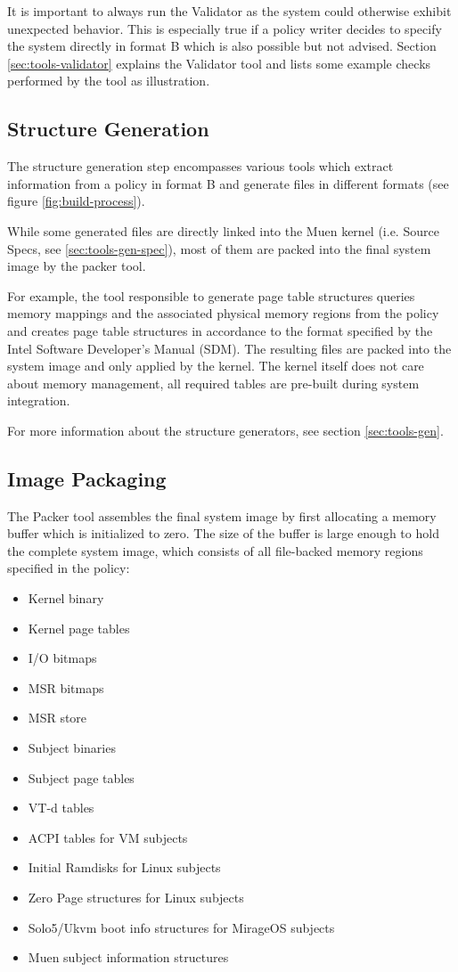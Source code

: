 \documentclass[a4paper,twoside,titlepage]{article}
\begin{document}
It is important to always run the Validator as the system could otherwise
exhibit unexpected behavior. This is especially true if a policy writer decides
to specify the system directly in format B which is also possible but not
advised. Section \ref{sec:tools-validator} explains the Validator tool and
lists some example checks performed by the tool as illustration.

\subsection{Structure Generation}
The structure generation step encompasses various tools which extract
information from a policy in format B and generate files in different formats
(see figure \ref{fig:build-process}).

While some generated files are directly linked into the Muen kernel (i.e.
Source Specs, see \ref{sec:tools-gen-spec}), most of them are packed into the
final system image by the packer tool.

For example, the tool responsible to generate page table structures queries
memory mappings and the associated physical memory regions from the policy and
creates page table structures in accordance to the format specified by the
Intel Software Developer's Manual (SDM). The resulting files are packed into
the system image and only applied by the kernel. The kernel itself does not
care about memory management, all required tables are pre-built during system
integration.

For more information about the structure generators, see section
\ref{sec:tools-gen}.

\subsection{Image Packaging}
The Packer tool assembles the final system image by first allocating a memory
buffer which is initialized to zero. The size of the buffer is large enough to
hold the complete system image, which consists of all file-backed memory
regions specified in the policy:

\begin{itemize}
	\item Kernel binary
	\item Kernel page tables
	\item I/O bitmaps
	\item MSR bitmaps
	\item MSR store
	\item Subject binaries
	\item Subject page tables
	\item VT-d tables
	\item ACPI tables for VM subjects
	\item Initial Ramdisks for Linux subjects
	\item Zero Page structures for Linux subjects
	\item Solo5/Ukvm boot info structures for MirageOS subjects
	\item Muen subject information structures
\end{itemize}
\end{document}
